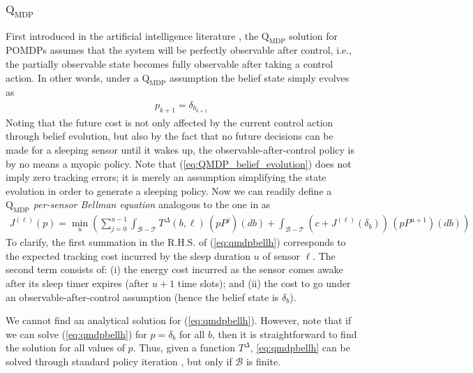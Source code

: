 \documentclass[journal,draftcls,onecolumn,11pt]{IEEEtran}
\newcommand{\QMDP}{$\text{Q}_{\text{MDP}}$}
\newcommand{\term}{\mathcal{T}}
\begin{document}
\subsubsection{\QMDP{}}
First introduced in the artificial intelligence literature \cite{cassandra97,QMDP}, the \QMDP{} solution for POMDPs assumes that the system will be perfectly observable after control, i.e., the partially observable state becomes fully observable after taking a control action. In other words, under a \QMDP{} assumption the belief state simply evolves as
\begin{align}
p_{k+1}=\delta_{b_{k+1}}
\label{eq:QMDP_belief_evolution}
\end{align}
Noting that the future cost is not only affected by the current control action through belief evolution, but also by the fact that no future decisions can be made for a sleeping sensor until it wakes up, the observable-after-control policy is by no means a myopic policy. Note that (\ref{eq:QMDP_belief_evolution}) does not imply zero tracking errors; it is merely an assumption simplifying the state evolution in order to generate a sleeping policy. Now we can readily define a {\em \QMDP{} per-sensor Bellman equation} analogous to the one in \cite{fuemmeler08} as
\begin{align} \label{eq:qmdpbellh}
   J^{(\ell)}(p) = \min_{u} \left(
      \sum_{j=0}^{u-1} \int_{\mathcal{B}-\term} T^\Delta(b,\ell) \, (p P^j)(db) +
      \int_{\mathcal{B}-\term} \left(
         c + J^{(\ell)}(\delta_b)
      \right)  \, (p P^{u+1})(db)
   \right)
\end{align}
To clarify, the first summation in the R.H.S. of (\ref{eq:qmdpbellh}) corresponds to the expected tracking cost incurred by the sleep duration $u$ of sensor $\ell$. The second term consists of: (i) the energy cost incurred as the sensor comes awake after its sleep timer expires (after $u+1$ time slots); and (ii) the cost to go under an observable-after-control assumption (hence the belief state is $\delta_b$).

We cannot find an analytical solution for (\ref{eq:qmdpbellh}). However, note that if we can solve (\ref{eq:qmdpbellh}) for $p=\delta_b$ for all $b$, then it is straightforward to find the solution for all values of $p$. Thus, given a function $T^\Delta$, \eqref{eq:qmdpbellh} can be solved through standard policy iteration \cite{bertsekas07}, but only if $\mathcal{B}$ is finite.
\end{document}
